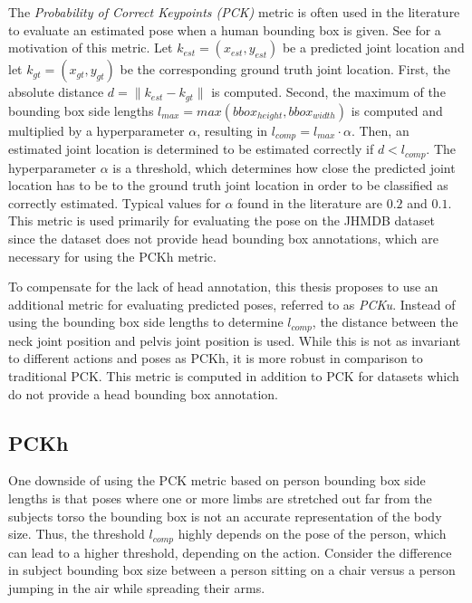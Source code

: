 The \textit{Probability of Correct Keypoints (PCK)} metric \cite{ferrari_progressive_2008} is often used in the literature to evaluate an estimated pose when a human bounding box is given.
See  for a motivation of this metric.
Let $k_{est} = (x_{est}, y_{est})$ be a predicted joint location and let $k_{gt} = (x_{gt}, y_{gt})$ be the corresponding ground truth joint location.
First, the absolute distance $d = \lVert k_{est} - k_{gt} \rVert$ is computed.
Second, the maximum of the bounding box side lengths $l_{max} = max(bbox_{height}, bbox_{width})$ is computed and multiplied by a hyperparameter $\alpha$, resulting in $l_{comp} = l_{max} \cdot \alpha$.
Then, an estimated joint location is determined to be estimated correctly if $d < l_{comp}$.
The hyperparameter $\alpha$ is a threshold, which determines how close the predicted joint location has to be to the ground truth joint location in order to be classified as correctly estimated.
Typical values for $\alpha$ found in the literature are $0.2$ and $0.1$.
This metric is used primarily for evaluating the pose on the JHMDB dataset since the dataset does not provide head bounding box annotations, which are necessary for using the PCKh metric.

To compensate for the lack of head annotation, this thesis proposes to use an additional metric for evaluating predicted poses, referred to as \textit{PCKu}.
Instead of using the bounding box side lengths to determine $l_{comp}$, the distance between the neck joint position and pelvis joint position is used.
While this is not as invariant to different actions and poses as PCKh, it is more robust in comparison to traditional PCK.
This metric is computed in addition to PCK for datasets which do not provide a head bounding box annotation.

\subsection{PCKh}
\label{sec:exp-pckh}
One downside of using the PCK metric based on person bounding box side lengths is that poses where one or more limbs are stretched out far from the subjects torso the bounding box is not an accurate representation of the body size.
Thus, the threshold $l_{comp}$ highly depends on the pose of the person, which can lead to a higher threshold, depending on the action.
Consider the difference in subject bounding box size between a person sitting on a chair versus a person jumping in the air while spreading their arms.

